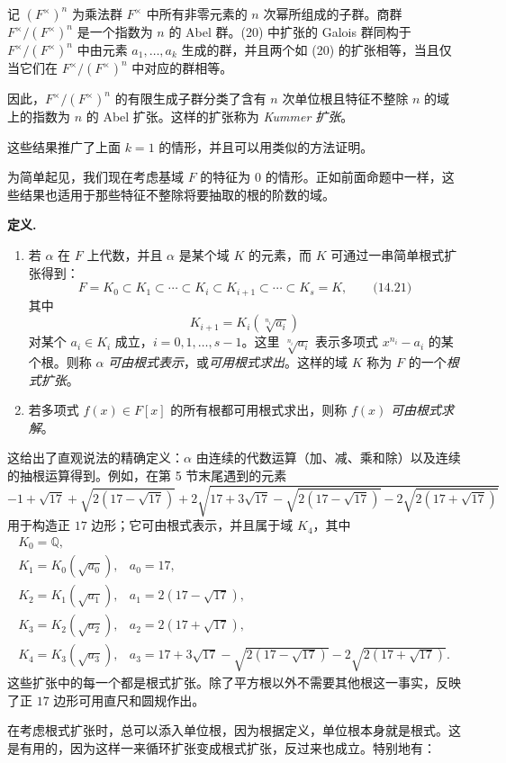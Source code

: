 记 $(F^\times)^n$ 为乘法群 $F^\times$ 中所有非零元素的 $n$ 次幂所组成的子群。商群 $F^\times/(F^\times)^n$ 是一个指数为 $n$ 的 Abel 群。(20) 中扩张的 Galois 群同构于 $F^\times/(F^\times)^n$ 中由元素 $a_1,\ldots,a_k$ 生成的群，并且两个如 (20) 的扩张相等，当且仅当它们在 $F^\times/(F^\times)^n$ 中对应的群相等。

因此，$F^\times/(F^\times)^n$ 的有限生成子群分类了含有 $n$ 次单位根且特征不整除 $n$ 的域上的指数为 $n$ 的 Abel 扩张。这样的扩张称为 \emph{Kummer 扩张}。

这些结果推广了上面 $k=1$ 的情形，并且可以用类似的方法证明。

为简单起见，我们现在考虑基域 $F$ 的特征为 $0$ 的情形。正如前面命题中一样，这些结果也适用于那些特征不整除将要抽取的根的阶数的域。

\noindent\textbf{定义.}
\begin{enumerate}[label=(\arabic*)]
\item 若 $\alpha$ 在 $F$ 上代数，并且 $\alpha$ 是某个域 $K$ 的元素，而 $K$ 可通过一串简单根式扩张得到：
\[
F=K_0\subset K_1\subset\cdots\subset K_i\subset K_{i+1}\subset\cdots\subset K_s=K, \qquad\text{(14.21)}
\]
其中
\[
K_{i+1}=K_i(\sqrt[n_i]{a_i})
\]
对某个 $a_i\in K_i$ 成立，$i=0,1,\ldots,s-1$。这里 $\sqrt[n_i]{a_i}$ 表示多项式 $x^{n_i}-a_i$ 的某个根。则称 $\alpha$ \emph{可由根式表示}，或\emph{可用根式求出}。这样的域 $K$ 称为 $F$ 的一个\emph{根式扩张}。
\item 若多项式 $f(x)\in F[x]$ 的所有根都可用根式求出，则称 $f(x)$ \emph{可由根式求解}。
\end{enumerate}

这给出了直观说法的精确定义：$\alpha$ 由连续的代数运算（加、减、乘和除）以及连续的抽根运算得到。例如，在第 5 节末尾遇到的元素
\[
-1+\sqrt{17}+\sqrt{2(17-\sqrt{17})}
+2\sqrt{17+3\sqrt{17}-\sqrt{2(17-\sqrt{17})}-2\sqrt{2(17+\sqrt{17})}}
\]
用于构造正 $17$ 边形；它可由根式表示，并且属于域 $K_4$，其中
\[
\begin{array}{ll}
K_0=\mathbb Q, & \\
K_1=K_0(\sqrt{a_0}), & a_0=17,\\
K_2=K_1(\sqrt{a_1}), & a_1=2(17-\sqrt{17}),\\
K_3=K_2(\sqrt{a_2}), & a_2=2(17+\sqrt{17}),\\
K_4=K_3(\sqrt{a_3}), & a_3=17+3\sqrt{17}-\sqrt{2(17-\sqrt{17})}-2\sqrt{2(17+\sqrt{17})}.
\end{array}
\]
这些扩张中的每一个都是根式扩张。除了平方根以外不需要其他根这一事实，反映了正 $17$ 边形可用直尺和圆规作出。

在考虑根式扩张时，总可以添入单位根，因为根据定义，单位根本身就是根式。这是有用的，因为这样一来循环扩张变成根式扩张，反过来也成立。特别地有：

